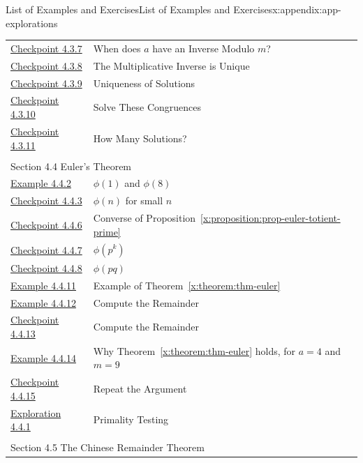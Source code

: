 \documentclass[oneside,10pt,]{book}
\newcommand{\xreffont}{\relax}
\numberwithin{equation}{section}
\begin{document}
\begin{appendixptx}{List of Examples and Exercises}{}{List of Examples and Exercises}{}{}{x:appendix:app-explorations}
\begin{longtable}[l]{ll}
\hyperref[x:exercise:ex-cong-inverse-existence]{Checkpoint 4.3.7}& When does \(a\) have an Inverse Modulo \(m\)?\\
\hyperref[x:exercise:ex-cong-prove-inverse-unique]{Checkpoint 4.3.8}& The Multiplicative Inverse is Unique\\
\hyperref[x:exercise:ex-cong-rel-prime-unique]{Checkpoint 4.3.9}& Uniqueness of Solutions\\
\hyperref[x:exercise:ex-cong-solve-congruences]{Checkpoint 4.3.10}& Solve These Congruences\\
\hyperref[x:exercise:ex-cong-how-many-solutions]{Checkpoint 4.3.11}& How Many Solutions?\\
\multicolumn{2}{l}{\null}\\[1.5ex] \multicolumn{2}{l}{\large Section 4.4 Euler's Theorem}\\[0.5ex]
\hyperref[x:example:eg-cong-totient]{Example 4.4.2}& \(\phi(1)\) and \(\phi(8)\)\\
\hyperref[x:exercise:ex-cong-totient]{Checkpoint 4.4.3}& \(\phi(n)\) for small \(n\)\\
\hyperref[x:exercise:ex-cong-euler-totient-prime-converse]{Checkpoint 4.4.6}& Converse of Proposition~{\xreffont\ref*{x:proposition:prop-euler-totient-prime}}\\
\hyperref[x:exercise:ex-cong-euler-totient-prime-power]{Checkpoint 4.4.7}& \(\phi(p^k)\)\\
\hyperref[x:exercise:ex-cong-euler-totient-prime-product]{Checkpoint 4.4.8}& \(\phi(pq)\)\\
\hyperref[x:example:eg-cong-euler-apply]{Example 4.4.11}& Example of Theorem~{\xreffont\ref*{x:theorem:thm-euler}}\\
\hyperref[x:example:eg-cong-euler-remainder]{Example 4.4.12}& Compute the Remainder\\
\hyperref[x:exercise:ex-cong-euler-remainder]{Checkpoint 4.4.13}& Compute the Remainder\\
\hyperref[x:example:eg-cong-euler-proof-example]{Example 4.4.14}& Why Theorem~{\xreffont\ref*{x:theorem:thm-euler}} holds, for \(a = 4\) and \(m = 9\)\\
\hyperref[x:exercise:ex-cong-euler-proof-example-again]{Checkpoint 4.4.15}& Repeat the Argument\\
\hyperref[x:exploration:expl-primality-testing]{Exploration 4.4.1}& Primality Testing\\
\multicolumn{2}{l}{\null}\\[1.5ex] \multicolumn{2}{l}{\large Section 4.5 The Chinese Remainder Theorem}\\[0.5ex]

\end{longtable}
\end{appendixptx}
\end{document}
